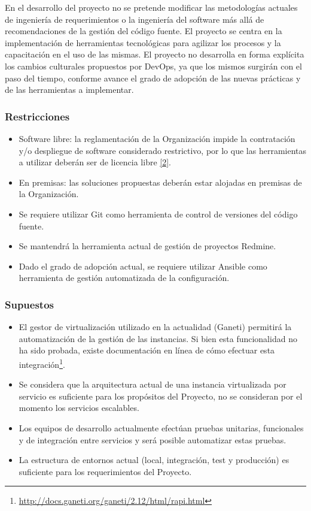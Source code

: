 En el desarrollo del proyecto no se pretende modificar las metodologías actuales de ingeniería de requerimientos o la ingeniería del software más allá de recomendaciones de la gestión del código fuente. El proyecto se centra en la implementación de herramientas tecnológicas para agilizar los procesos y la capacitación en el uso de las mismas. El proyecto no desarrolla en forma explícita los cambios culturales propuestos por DevOps, ya que los mismos surgirán con el paso del tiempo, conforme avance el grado de adopción de las nuevas prácticas y de las herramientas a implementar.

\subsubsection{Restricciones}

\begin{itemize}
\item Software libre: la reglamentación de la Organización impide la contratación y/o despliegue de software considerado restrictivo, por lo que las herramientas a utilizar deberán ser de licencia libre \href{https://www.zotero.org/google-docs/?656h4O}{[2]}.
\item En premisas: las soluciones propuestas deberán estar alojadas en premisas de la Organización.
\item Se requiere utilizar Git como herramienta de control de versiones del código fuente.
\item Se mantendrá la herramienta actual de gestión de proyectos Redmine.
\item Dado el grado de adopción actual, se requiere utilizar Ansible como herramienta de gestión automatizada de la configuración.
\end{itemize}
\subsubsection{Supuestos}

\begin{itemize}
\item El gestor de virtualización utilizado en la actualidad (Ganeti) permitirá la automatización de la gestión de las instancias. Si bien esta funcionalidad no ha sido probada, existe documentación en línea de cómo efectuar esta integración\footnote{ \href{http://docs.ganeti.org/ganeti/2.12/html/rapi.html}{http://docs.ganeti.org/ganeti/2.12/html/rapi.html} }.
\item Se considera que la arquitectura actual de una instancia virtualizada por servicio es suficiente para los propósitos del Proyecto, no se consideran por el momento los servicios escalables.
\item Los equipos de desarrollo actualmente efectúan pruebas unitarias, funcionales y de integración entre servicios y será posible automatizar estas pruebas.
\item La estructura de entornos actual (local, integración, test y producción) es suficiente para los requerimientos del Proyecto.
\end{itemize}
